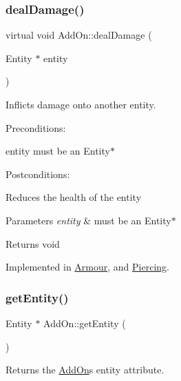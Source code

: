 \subsubsection{\texorpdfstring{deal\+Damage()}{dealDamage()}}
{\footnotesize\ttfamily virtual void Add\+On\+::deal\+Damage (\begin{DoxyParamCaption}\item[{Entity $\ast$}]{entity }\end{DoxyParamCaption})\hspace{0.3cm}{\ttfamily [pure virtual]}}



Inflicts damage onto another entity. 

Preconditions\+:
\begin{DoxyItemize}
\item entity must be an Entity$\ast$
\end{DoxyItemize}

Postconditions\+:
\begin{DoxyItemize}
\item Reduces the health of the entity
\end{DoxyItemize}


\begin{DoxyParams}{Parameters}
{\em entity} & must be an Entity$\ast$ \\
\hline
\end{DoxyParams}
\begin{DoxyReturn}{Returns}
void 
\end{DoxyReturn}


Implemented in \hyperlink{classArmour_acce6c768aaebaa559ac063e9d67c53b5}{Armour}, and \hyperlink{classPiercing_a2dbd4a497f9abbebbbd2ceb2909f6163}{Piercing}.

\mbox{\label{classAddOn_aaf2f3af4104c7cb69ac67766790ce393}} 
\subsubsection{\texorpdfstring{get\+Entity()}{getEntity()}}
{\footnotesize\ttfamily Entity $\ast$ Add\+On\+::get\+Entity (\begin{DoxyParamCaption}{ }\end{DoxyParamCaption})}



Returns the \hyperlink{classAddOn}{Add\+On}\textquotesingle{}s entity attribute. 

